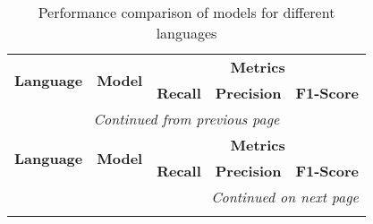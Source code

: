 
\onecolumn %
\begin{longtable}{llccc}
    \caption{Performance comparison of models for different languages} \label{tab:model_selection}                                                                                             \\
    \toprule
    \multirow{2}{*}{\textbf{Language}}    & \multirow{2}{*}{\textbf{Model}}                                    & \multicolumn{3}{c}{\textbf{Metrics}}                                          \\
    \cmidrule(lr){3-5}
                                          &                                                                    & \textbf{Recall}                      & \textbf{Precision} & \textbf{F1-Score} \\
    \midrule
    \endfirsthead

    \multicolumn{5}{c}{\textit{Continued from previous page}}                                                                                                                                  \\
    \toprule
    \multirow{2}{*}{\textbf{Language}}    & \multirow{2}{*}{\textbf{Model}}                                    & \multicolumn{3}{c}{\textbf{Metrics}}                                          \\
    \cmidrule(lr){3-5}
                                          &                                                                    & \textbf{Recall}                      & \textbf{Precision} & \textbf{F1-Score} \\
    \midrule
    \endhead

    \midrule \multicolumn{5}{r}{\textit{Continued on next page}}                                                                                                                               \\
    \endfoot

    \bottomrule
    \endlastfoot


\end{longtable}
